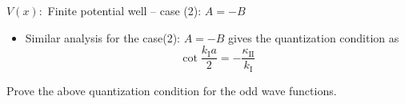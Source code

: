 %
\begin{frame}{\(V(x) :\) Finite potential well -- case (2):  \( A = -B\)}
	\begin{itemize}
		\item Similar analysis for the case(2): \(A=-B\) gives the quantization condition as
		\[
		\cot \frac{k_\text{I}a}{2} = -\frac{\kappa_\text{II}}{k_\text{I}}
		\]
	\end{itemize}
	\begin{problem}
		Prove the above quantization condition for the odd wave functions.
	\end{problem}
\end{frame}